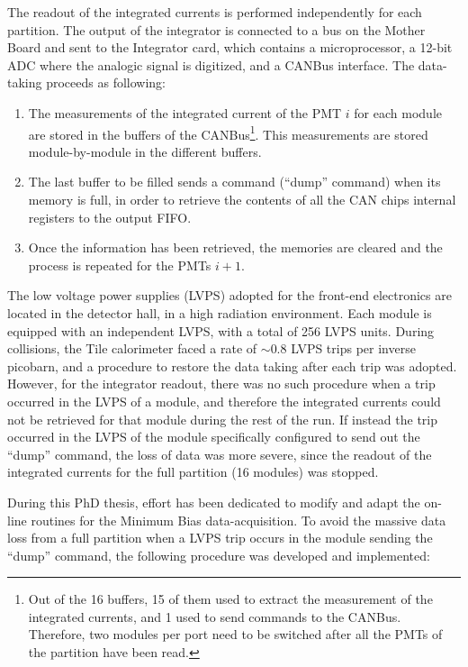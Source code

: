 The readout of the integrated currents is performed independently for each partition.
The output of the integrator is connected to a bus on the Mother Board and sent to the Integrator card, which contains a microprocessor, a 12-bit ADC where the analogic signal is digitized, and a CANBus interface.
The data-taking proceeds as following:

\begin{enumerate}
\item The measurements of the integrated current of the PMT $i$ for each module are stored in the buffers of the CANBus\footnote{Out of the 16 buffers, 15 of them used to extract the measurement of the integrated currents, and 1 used to send commands to the CANBus. Therefore, two modules per port need to be switched after all the PMTs of the partition have been read.}.
This measurements are stored  module-by-module in the different buffers.
\item The last buffer to be filled sends a command (``dump'' command) when its memory is full, in order to retrieve the contents of all the CAN chips internal registers to the output FIFO.
\item Once the information has been retrieved, the memories are cleared and the process is repeated for the PMTs $i+1$.
\end{enumerate}

The low voltage power supplies (LVPS) adopted for the front-end electronics are located in the detector hall, in a high radiation environment. 
Each module is equipped with an independent LVPS, with a total of 256 LVPS units. 
During collisions, the Tile calorimeter faced a rate of $\sim 0.8$ LVPS trips per inverse picobarn, and a procedure to restore the data taking after each trip was adopted.
However, for the integrator readout, there was no such procedure when a trip occurred in the LVPS of a module, and therefore the integrated currents could not be retrieved for that module during the rest of the run.
If instead the trip occurred in the LVPS of the module specifically configured to send out the ``dump'' command, the loss of data was more severe, since the readout of the integrated currents for the full partition (16 modules) was stopped.

During this PhD thesis, effort has been dedicated to modify and adapt the on-line routines for the Minimum Bias data-acquisition.
To avoid the massive data loss from a full partition when a LVPS trip occurs in the module sending the ``dump'' command, the following procedure was developed and implemented:


